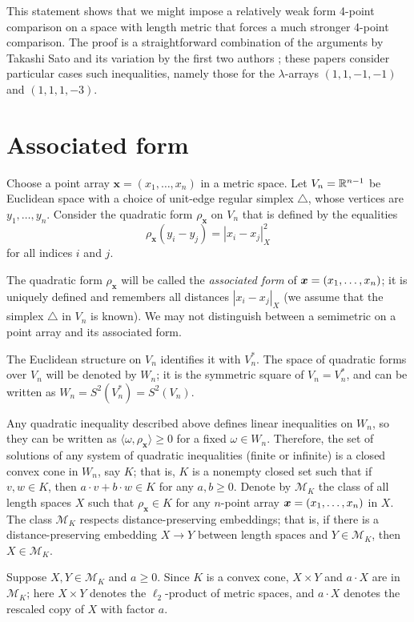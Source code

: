 \documentclass[a4paper,10pt]{article}
\begin{document}
This statement shows that we might impose a relatively weak form 4-point comparison on a space with length metric that forces a much stronger 4-point comparison.
The proof is a straightforward combination of the arguments by Takashi Sato \cite{sato} and its variation by the first two authors \cite{lebedeva-petrunin-2010};
these papers consider particular cases
such inequalities, namely those for the $\lambda$-arrays $(1,1,-1,-1)$ and $(1,1,1,-3)$.

\section{Associated form}\label{Associated form}

Choose a point array $\bm{x}=(x_1,\dots,x_n)$ in a metric space.
Let $V_n\z=\RR^{n-1}$ be Euclidean space with a choice of unit-edge regular simplex $\triangle$, whose vertices are $y_1,\dots,y_n$.
Consider the quadratic form $\rho_{\bm{x}}$ on $V_n$ that is defined by the equalities
\[\rho_{\bm{x}}(y_i-y_j)=|x_i-x_j|^2_X\]
for all indices $i$ and $j$.

The quadratic form $\rho_{\bm{x}}$ will be called the \emph{associated form} of $\bm{x}=(x_1,\z\dots,x_n)$;
it is uniquely defined and remembers all distances $|x_i-x_j|_X$
(we assume that the simplex $\triangle$ in $V_n$ is known).
We may not distinguish between a semimetric on a point array and its associated form.

The Euclidean structure on $V_n$ identifies it with $V_n^*$.
The space of quadratic forms over $V_n$ will be denoted by $W_n$;
it is the symmetric square of $V_n=V_n^*$, and can be written as $W_n=S^2(V_n^*)=S^2(V_n)$.

Any quadratic inequality described above defines linear inequalities on $W_n$, so they can be written as $\langle\omega,\rho_{\bm{x}}\rangle\ge 0$ for a fixed $\omega\in W_n$.
Therefore, the set of solutions of any system of quadratic inequalities (finite or infinite) is a closed convex cone in $W_n$, say $K$;
that is, $K$ is a nonempty closed set such that if $v,w\in K$, then $a\cdot v+b\cdot w\in K$ for any $a,b\ge0$.
Denote by $\mathcal{M}_K$ the class of all length spaces $X$ such that
$\rho_{\bm{x}}\in K$ for any $n$-point array $\bm{x}\z=(x_1,\dots,x_n)$ in $X$.
The class $\mathcal{M}_K$ respects distance-preserving embeddings; that is,
if there is a distance-preserving embedding $X\to Y$ between length spaces and $Y \in  \mathcal{M}_K$, then $X\in \mathcal{M}_K$.

Suppose $X,Y\in  \mathcal{M}_K$ and $a\ge 0$.
Since $K$ is a convex cone,  $X\times Y$ and $a\cdot X$ are in $\mathcal{M}_K$;
here $X\times Y$ denotes the $\ell_2$-product of metric spaces, and
$a\cdot X$ denotes the rescaled copy of $X$ with factor $a$.
\end{document}
